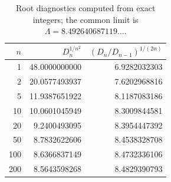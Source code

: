 \begin{table}[htbp]
\centering
\small
\begin{tabular}{rrr}
\toprule
$n$ & $D_n^{1/n^2}$ & $(D_n/D_{n-1})^{1/(2n)}$ \\
\midrule
1 & 48.0000000000 & 6.9282032303 \\
2 & 20.0577493937 & 7.6202968816 \\
5 & 11.9387651922 & 8.1187083186 \\
10 & 10.0601045949 & 8.3009844581 \\
20 & 9.2400493095 & 8.3954447392 \\
50 & 8.7832622606 & 8.4538328708 \\
100 & 8.6366837149 & 8.4732336106 \\
200 & 8.5643598268 & 8.4829390793 \\
\bottomrule
\end{tabular}
\caption{Root diagnostics computed from exact integers; the common limit is $\Lambda=8.492640687119\ldots$.}\label{tab:numerical}
\end{table}
